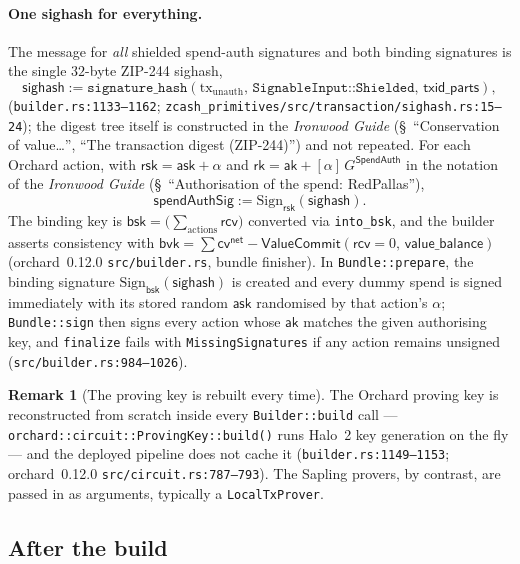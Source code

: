 \documentclass[11pt,a4paper]{article}
\theoremstyle{definition}
\newtheorem{remark}[theorem]{Remark}
\newcommand{\cvsym}{\mathsf{cv}}
\newcommand{\rk}{\mathsf{rk}}
\newcommand{\ask}{\ensuremath{\mathsf{ask}}}
\newcommand{\aksym}{\ensuremath{\mathsf{ak}}}
\newcommand{\rcv}{\ensuremath{\mathsf{rcv}}}
\newcommand{\rsk}{\ensuremath{\mathsf{rsk}}}
\begin{document}
\paragraph{One sighash for everything.} The message for \emph{all} shielded
spend-auth signatures and both binding signatures is the single $32$-byte
ZIP-244 sighash,
\[
\mathsf{sighash} := \texttt{signature\_hash}(\mathrm{tx}_{\mathrm{unauth}},\,
\texttt{SignableInput::Shielded},\, \mathsf{txid\_parts}),
\]
(\texttt{builder.rs:1133--1162};
\texttt{zcash\_primitives/src/transaction/sighash.rs:15--24}); the digest
tree itself is constructed in the \emph{Ironwood Guide}
(\S~``Conservation of value\dots'', ``The transaction digest (ZIP-244)'')
and not repeated. For each Orchard action, with
$\rsk = \ask + \alpha$ and $\rk = \aksym + [\alpha]\,G^{\mathsf{SpendAuth}}$
in the notation of the \emph{Ironwood Guide}
(\S~``Authorisation of the spend: RedPallas''),
\[
\mathsf{spendAuthSig} := \mathrm{Sign}_{\rsk}(\mathsf{sighash}).
\]
The binding key is
$\mathsf{bsk} = \bigl(\sum_{\text{actions}} \rcv\bigr)$ converted via
\texttt{into\_bsk}, and the builder asserts consistency with
$\mathsf{bvk} = \sum \cvsym^{\mathsf{net}} -
\mathsf{ValueCommit}(\rcv = 0,\, \mathsf{value\_balance})$
(\textsf{orchard}~0.12.0 \texttt{src/builder.rs}, bundle finisher). In
\texttt{Bundle::prepare}, the binding signature
$\mathrm{Sign}_{\mathsf{bsk}}(\mathsf{sighash})$ is created and every dummy
spend is signed immediately with its stored random $\ask$ randomised by that
action's $\alpha$; \texttt{Bundle::sign} then signs every action whose
$\aksym$ matches the given authorising key, and \texttt{finalize} fails with
\texttt{MissingSignatures} if any action remains unsigned
(\texttt{src/builder.rs:984--1026}).

\begin{remark}[The proving key is rebuilt every time]\label{rem:pk-rebuild}
The Orchard proving key is reconstructed from scratch inside every
\texttt{Builder::build} call --- \texttt{orchard::circuit::ProvingKey::build()}
runs Halo~2 key generation on the fly --- and the deployed pipeline does not
cache it (\texttt{builder.rs:1149--1153}; \textsf{orchard}~0.12.0
\texttt{src/circuit.rs:787--793}). The Sapling provers, by contrast, are
passed in as arguments, typically a \texttt{LocalTxProver}.
\end{remark}

\subsection{After the build}\label{sec:pipeline-after}
\end{document}
